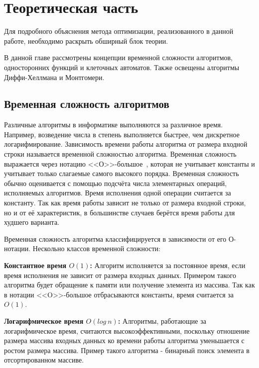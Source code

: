 \documentclass[times,specification,annotation]{itmo-student-thesis}
\begin{document}
\chapter{Теоретическая часть}

\startrelatedwork
Для подробного объяснения метода оптимизации, реализованного в данной работе, необходимо раскрыть обширный блок теории.\par
В данной главе рассмотрены концепции временной сложности алгоритмов, односторонних функций и клеточных автоматов.
Также освещены алгоритмы Диффи-Хеллмана и Монтгомери.

\section{Временная сложность алгоритмов}\label{sec:asympt}

Различные алгоритмы в информатике выполняются за различное время.
Например, возведение числа в степень выполняется быстрее, чем дискретное логарифмирование.
Зависимость времени работы алгоритма от размера входной строки называется временной сложностью алгоритма.
Временная сложность выражается через нотацию <<О>>-большое~\cite{knu97}, которая не учитывает константы
и учитывает только слагаемые самого высокого порядка.
Временная сложность обычно оценивается с помощью подсчёта числа элементарных операций, исполняемых алгоритмов.
Время исполнения одной операции считается за константу.
Так как время работы зависит не только от размера входной строки, но и от её характеристик,
в большинстве случаев берётся время работы для худшего варианта.\par
Временная сложность алгоритма классифицируется в зависимости от его О-нотации.
Нескольно классов временной сложности:\par
\textbf{Константное время $O(1)$:}
Алгоритм исполняется за постоянное время,
если время исполнения не зависит от размера входных данных.
Примером такого алгоритма будет обращение к памяти или получение элемента из массива.
Так как в нотации <<O>>-большое отбрасываются константы, время считается за $O(1)$.
\par

\textbf{Логарифмическое время $O(log~n)$:}
Алгоритмы, работающие за логарифмическое время, считаются высокоэффективными, поскольку
отношение размера массива входных данных ко времени работы алгоритма уменьшается с ростом размера массива.
Пример такого алгоритма - бинарный поиск элемента в отсортированном массиве.
\par
\end{document}
